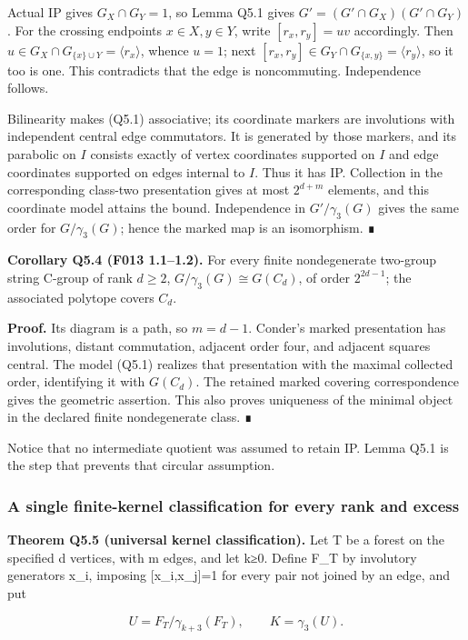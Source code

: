 \documentclass[
  10pt,
  letterpaper,
]{article}
\begin{document}
Actual IP gives \(G_X\cap G_Y=1\), so Lemma Q5.1 gives
\(G'=(G'\cap G_X)(G'\cap G_Y)\). For the crossing endpoints
\(x\in X,y\in Y\), write \([r_x,r_y]=uv\) accordingly. Then
\(u\in G_X\cap G_{\{x\}\cup Y}=\langle r_x\rangle\), whence \(u=1\);
next \([r_x,r_y]\in G_Y\cap G_{\{x,y\}}=\langle r_y\rangle\), so it too
is one. This contradicts that the edge is noncommuting. Independence
follows.

Bilinearity makes (Q5.1) associative; its coordinate markers are
involutions with independent central edge commutators. It is generated
by those markers, and its parabolic on \(I\) consists exactly of vertex
coordinates supported on \(I\) and edge coordinates supported on edges
internal to \(I\). Thus it has IP. Collection in the corresponding
class-two presentation gives at most \(2^{d+m}\) elements, and this
coordinate model attains the bound. Independence in \(G'/\gamma_3(G)\)
gives the same order for \(G/\gamma_3(G)\); hence the marked map is an
isomorphism. ∎

\textbf{Corollary Q5.4 (F013 1.1--1.2).} For every finite nondegenerate
two-group string C-group of rank \(d\ge2\),
\(G/\gamma_3(G)\cong G(C_d)\), of order \(2^{2d-1}\); the associated
polytope covers \(C_d\).

\textbf{Proof.} Its diagram is a path, so \(m=d-1\). Conder's marked
presentation has involutions, distant commutation, adjacent order four,
and adjacent squares central. The model (Q5.1) realizes that
presentation with the maximal collected order, identifying it with
\(G(C_d)\). The retained marked covering correspondence gives the
geometric assertion. This also proves uniqueness of the minimal object
in the declared finite nondegenerate class. ∎

Notice that no intermediate quotient was assumed to retain IP. Lemma
Q5.1 is the step that prevents that circular assumption.

\subsubsection{A single finite-kernel classification for every rank and
excess}\label{a-single-finite-kernel-classification-for-every-rank-and-excess}

\textbf{Theorem Q5.5 (universal kernel classification).} Let T be a
forest on the specified d vertices, with m edges, and let k≥0. Define
F\_T by involutory generators x\_i, imposing {[}x\_i,x\_j{]}=1 for every
pair not joined by an edge, and put

\[
U=F_T/\gamma_{k+3}(F_T),\qquad K=\gamma_3(U).
\tag{Q5.2}
\]
\end{document}
